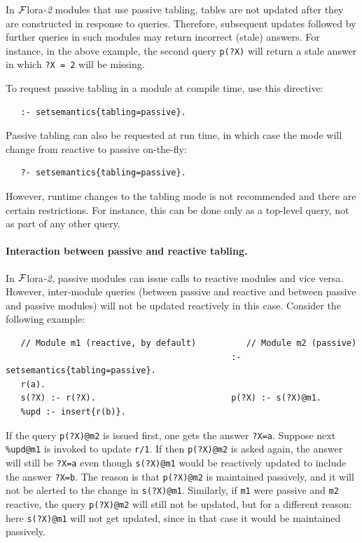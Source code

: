 \documentclass[11pt]{article}
\newcommand{\FLORA}{{\mbox{\sc ${\cal F}${lora}\rm\emph{-2}}}\xspace}
\newcommand{\FLSYSTEM}{\FLORA}
\begin{document}
In \FLSYSTEM modules that use passive tabling, tables are not updated
after they are constructed in response to queries. Therefore, subsequent
updates followed by further queries in such modules may
return incorrect (stale) answers. For instance, in the above example,
the second query \texttt{p(?X)} will return a stale answer in which 
\texttt{?X = 2} will be missing.  

To request passive tabling in a module at compile time, use this directive:
\begin{verbatim}
   :- setsemantics{tabling=passive}.
\end{verbatim}
Passive tabling can also be requested at run time, in which case the mode
will change from reactive to passive on-the-fly:
\begin{verbatim}
   ?- setsemantics{tabling=passive}.
\end{verbatim}
However, runtime changes to the tabling mode is not recommended and there
are certain restrictions. For instance, this can be done only as a
top-level query, not as part of any other query.

\paragraph{Interaction between passive and reactive tabling.}
In \FLSYSTEM, passive modules can issue calls to reactive modules and vice
versa. However, inter-module queries (between passive and reactive
and between passive and passive modules)
will not be updated reactively in this case.
Consider the following example:
\begin{verbatim}
   // Module m1 (reactive, by default)          // Module m2 (passive)
                                             :- setsemantics{tabling=passive}.
   r(a).                                     
   s(?X) :- r(?X).                           p(?X) :- s(?X)@m1.
   %upd :- insert{r(b)}.
\end{verbatim}
If the query \texttt{p(?X)@m2} is issued first, one gets the answer \texttt{?X=a}.
Suppose next \texttt{\%upd@m1} is invoked to update \texttt{r/1}.
If then \texttt{p(?X)@m2} is asked again, the answer will still be
\texttt{?X=a} even though \texttt{s(?X)@m1} would be reactively updated to
include the answer \texttt{?X=b}. The reason is that \texttt{p(?X)@m2} is
maintained passively, and it will not be alerted to the change in
\texttt{s(?X)@m1}. Similarly, if \texttt{m1}  were
passive and \texttt{m2} reactive, the query \texttt{p(?X)@m2} will still not be
updated, but for a different reason: here \texttt{s(?X)@m1} will not get
updated, since in that case it would be maintained passively.
\end{document}

